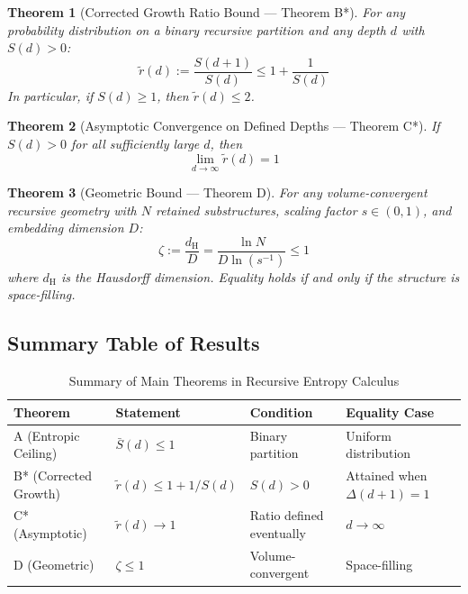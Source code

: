 \documentclass[11pt,a4paper]{article}
\newtheorem{theorem}{Theorem}[section]
\theoremstyle{definition}
\theoremstyle{remark}
\newcommand{\dH}{d_{\mathrm{H}}}
\newcommand{\Sbar}{\bar{S}}
\newcommand{\rtilde}{\tilde{r}}
\begin{document}
\begin{theorem}[Corrected Growth Ratio Bound --- Theorem B*]
\label{thm:B}
For any probability distribution on a binary recursive partition and any depth
$d$ with $S(d)>0$:
\begin{equation}
    \rtilde(d) := \frac{S(d+1)}{S(d)} \leq 1 + \frac{1}{S(d)}
\end{equation}
In particular, if $S(d)\ge1$, then $\rtilde(d)\le2$.
\end{theorem}

\begin{theorem}[Asymptotic Convergence on Defined Depths --- Theorem C*]
\label{thm:C}
If $S(d)>0$ for all sufficiently large $d$, then
\begin{equation}
    \lim_{d \to \infty} \rtilde(d) = 1
\end{equation}
\end{theorem}

\begin{theorem}[Geometric Bound --- Theorem D]
\label{thm:D}
For any volume-convergent recursive geometry with $N$ retained substructures, scaling factor $s \in (0,1)$, and embedding dimension $D$:
\begin{equation}
    \zeta := \frac{\dH}{D} = \frac{\ln N}{D \ln(s^{-1})} \leq 1
\end{equation}
where $\dH$ is the Hausdorff dimension. Equality holds if and only if the structure is space-filling.
\end{theorem}

\subsection{Summary Table of Results}

\begin{table}[H]
\centering
\caption{Summary of Main Theorems in Recursive Entropy Calculus}
\label{tab:main_results}
\begin{tabular}{@{}llll@{}}
\toprule
\textbf{Theorem} & \textbf{Statement} & \textbf{Condition} & \textbf{Equality Case} \\
\midrule
A (Entropic Ceiling) & $\Sbar(d) \leq 1$ & Binary partition & Uniform distribution \\
B* (Corrected Growth) & $\rtilde(d) \leq 1 + 1/S(d)$ & $S(d)>0$ & Attained when $\Delta(d+1)=1$ \\
C* (Asymptotic) & $\rtilde(d) \to 1$ & Ratio defined eventually & $d \to \infty$ \\
D (Geometric) & $\zeta \leq 1$ & Volume-convergent & Space-filling \\
\bottomrule
\end{tabular}
\end{table}
\end{document}
